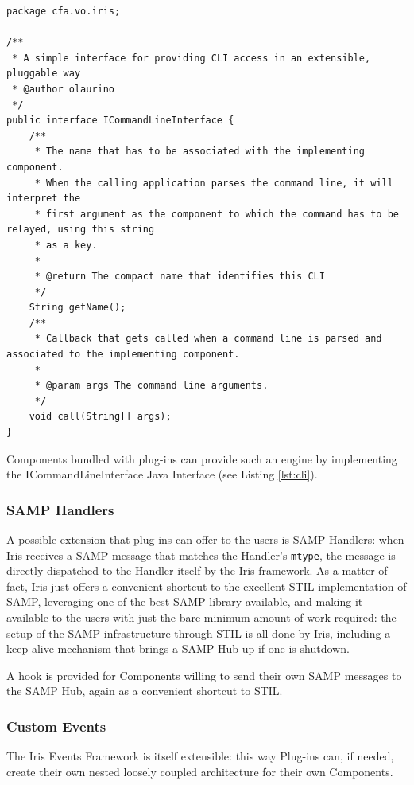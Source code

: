 \documentclass[5p]{elsarticle}
\begin{document}
\begin{lstlisting}[style=java, caption=My Caption, label=lst:cli]
package cfa.vo.iris;

/**
 * A simple interface for providing CLI access in an extensible, pluggable way
 * @author olaurino
 */
public interface ICommandLineInterface {
    /**
     * The name that has to be associated with the implementing component.
     * When the calling application parses the command line, it will interpret the
     * first argument as the component to which the command has to be relayed, using this string
     * as a key.
     *
     * @return The compact name that identifies this CLI
     */
    String getName();
    /**
     * Callback that gets called when a command line is parsed and associated to the implementing component.
     *
     * @param args The command line arguments.
     */
    void call(String[] args);
}
\end{lstlisting}


Components bundled with plug-ins can provide such an engine by implementing the ICommandLineInterface Java Interface (see Listing \ref{lst:cli}).

\subsubsection{SAMP Handlers}
A possible extension that plug-ins can offer to the users is SAMP Handlers: when Iris receives a SAMP message that matches the Handler's \verb|mtype|, the message is directly dispatched to the Handler itself by the Iris framework. As a matter of fact, Iris just offers a convenient shortcut to the excellent STIL implementation of SAMP, leveraging one of the best SAMP library available, and making it available to the users with just the bare minimum amount of work required: the setup of the SAMP infrastructure through STIL is all done by Iris, including a keep-alive mechanism that brings a SAMP Hub up if one is shutdown.

A hook is provided for Components willing to send their own SAMP messages to the SAMP Hub, again as a convenient shortcut to STIL.

\subsubsection{Custom Events}
The Iris Events Framework is itself extensible: this way Plug-ins can, if needed, create their own nested loosely coupled architecture for their own Components.
\end{document}
